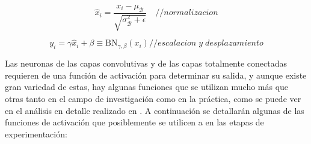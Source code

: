  \begin{equation}\label{formula:bn_normalization}
 \widehat{x}_{i} = \frac{x_{i}-\mu_{\mathcal{B}}}{\sqrt{\sigma_{\mathcal{B}}^{2}+\epsilon}}
\quad { // normalizacion}
 \end{equation}
 
 \begin{equation}\label{formula:bn_scale_and_shift}
 y_{i} = \gamma \widehat{x}_{i}+\beta \equiv \mathrm{B} \mathrm{N}_{\gamma, \beta}\left(x_{i}\right) {// escalacion \; y \; desplazamiento}
 \end{equation}
 
 Las neuronas de las capas convolutivas y de las capas totalmente conectadas requieren de una función de activación para determinar su salida, y aunque existe gran variedad de estas, hay algunas funciones que se utilizan mucho más que otras tanto en el campo de investigación como en la práctica, como se puede ver en el análisis en detalle realizado en \cite{nwankpa2018activation}. A continuación se detallarán algunas de las funciones de activación que posiblemente se utilicen a en las etapas de experimentación:
